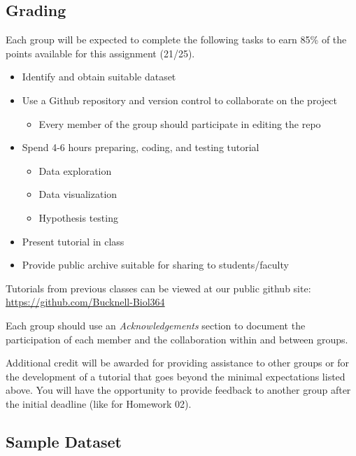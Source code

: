 \documentclass[
]{article}
\providecommand{\tightlist}{%
  \setlength{\itemsep}{0pt}\setlength{\parskip}{0pt}}
\begin{document}
\subsection{Grading}\label{grading}

Each group will be expected to complete the following tasks to earn 85\%
of the points available for this assignment (21/25).

\begin{itemize}
\tightlist
\item
  Identify and obtain suitable dataset
\item
  Use a Github repository and version control to collaborate on the
  project

  \begin{itemize}
  \tightlist
  \item
    Every member of the group should participate in editing the repo
  \end{itemize}
\item
  Spend 4-6 hours preparing, coding, and testing tutorial

  \begin{itemize}
  \tightlist
  \item
    Data exploration
  \item
    Data visualization
  \item
    Hypothesis testing
  \end{itemize}
\item
  Present tutorial in class
\item
  Provide public archive suitable for sharing to students/faculty
\end{itemize}

Tutorials from previous classes can be viewed at our public github site:
\url{https://github.com/Bucknell-Biol364}

Each group should use an \emph{Acknowledgements} section to document the
participation of each member and the collaboration within and between
groups.

Additional credit will be awarded for providing assistance to other
groups or for the development of a tutorial that goes beyond the minimal
expectations listed above. You will have the opportunity to provide
feedback to another group after the initial deadline (like for Homework
02).

\subsection{Sample Dataset}\label{sample-dataset}
\end{document}
